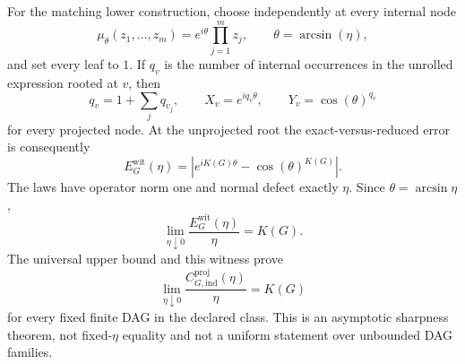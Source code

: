 For the matching lower construction, choose independently at every internal
node
\begin{equation*}
 \mu_\theta(z_1,\ldots,z_m)=e^{i\theta}\prod_{j=1}^m z_j,
 \qquad \theta=\arcsin(\eta),
\end{equation*}
and set every leaf to $1$.  If $q_v$ is the number of internal occurrences in
the unrolled expression rooted at $v$, then
\begin{equation*}
 q_v=1+\sum_jq_{v_j},\qquad
 X_v=e^{iq_v\theta},\qquad Y_v=\cos(\theta)^{q_v}
\end{equation*}
for every projected node.  At the unprojected root the exact-versus-reduced
error is consequently
\begin{equation*}
 E_G^{\mathrm{wit}}(\eta)=
 \left|e^{iK(G)\theta}-\cos(\theta)^{K(G)}\right|.
\end{equation*}
The laws have operator norm one and normal defect exactly $\eta$.  Since
$\theta=\arcsin\eta$,
\begin{equation*}
 \lim_{\eta\downarrow0}
 \frac{E_G^{\mathrm{wit}}(\eta)}{\eta}=K(G).
\end{equation*}
The universal upper bound and this witness prove
\begin{equation*}
 \lim_{\eta\downarrow0}
 \frac{C_{G,\mathrm{ind}}^{\mathrm{proj}}(\eta)}{\eta}=K(G)
\end{equation*}
for every fixed finite DAG in the declared class.  This is an asymptotic
sharpness theorem, not fixed-$\eta$ equality and not a uniform statement over
unbounded DAG families.

